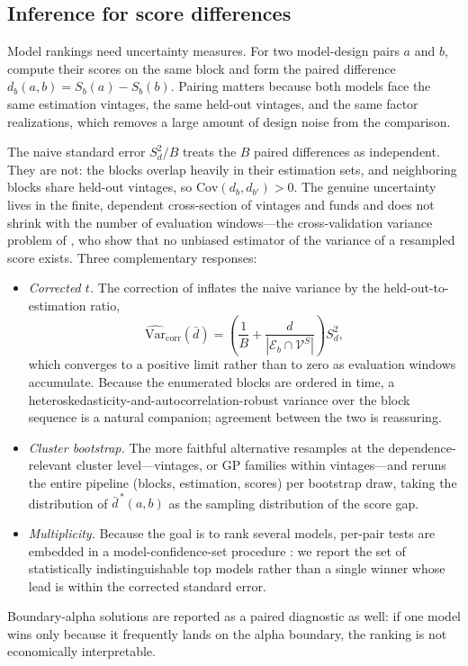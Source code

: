 \documentclass[11pt]{article}
\begin{document}
\subsection{Inference for score differences}
\label{sec:inference}

Model rankings need uncertainty measures. For two model-design pairs \(a\) and \(b\), compute their scores on the same block and form the paired difference \(d_b(a,b)=S_b(a)-S_b(b)\). Pairing matters because both models face the same estimation vintages, the same held-out vintages, and the same factor realizations, which removes a large amount of design noise from the comparison.

The naive standard error \(S_d^2/B\) treats the \(B\) paired differences as independent. They are not: the blocks overlap heavily in their estimation sets, and neighboring blocks share held-out vintages, so \(\mathrm{Cov}(d_b,d_{b'})>0\). The genuine uncertainty lives in the finite, dependent cross-section of vintages and funds and does not shrink with the number of evaluation windows---the cross-validation variance problem of \citet{BengioGrandvalet2004}, who show that no unbiased estimator of the variance of a resampled score exists. Three complementary responses:
\begin{itemize}
\item \emph{Corrected \(t\).} The correction of \citet{NadeauBengio2003} inflates the naive variance by the held-out-to-estimation ratio,
\[
\widehat{\mathrm{Var}}_{\mathrm{corr}}(\bar d)
=\left(\frac{1}{B}+\frac{d}{|\mathcal E_b\cap\mathcal V^S|}\right)S_d^2 ,
\]
which converges to a positive limit rather than to zero as evaluation windows accumulate. Because the enumerated blocks are ordered in time, a heteroskedasticity-and-autocorrelation-robust variance over the block sequence is a natural companion; agreement between the two is reassuring.
\item \emph{Cluster bootstrap.} The more faithful alternative resamples at the dependence-relevant cluster level---vintages, or GP families within vintages---and reruns the entire pipeline (blocks, estimation, scores) per bootstrap draw, taking the distribution of \(\bar d^{\,\ast}(a,b)\) as the sampling distribution of the score gap.
\item \emph{Multiplicity.} Because the goal is to rank several models, per-pair tests are embedded in a model-confidence-set procedure \citep{HansenLundeNason2011}: we report the set of statistically indistinguishable top models rather than a single winner whose lead is within the corrected standard error.
\end{itemize}
Boundary-alpha solutions are reported as a paired diagnostic as well: if one model wins only because it frequently lands on the alpha boundary, the ranking is not economically interpretable.
\end{document}
